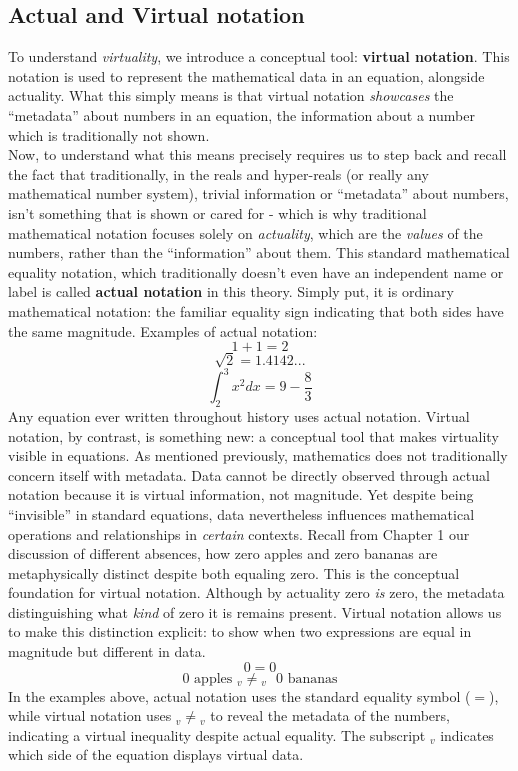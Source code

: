 \documentclass{article}
\begin{document}
\subsection{Actual and Virtual notation}
To understand \textit{virtuality}, we introduce a conceptual tool: \textbf{virtual notation}. This notation is used to represent the mathematical data in an equation, alongside actuality. What this simply means is that virtual notation \textit{showcases} the ``metadata'' about numbers in an equation, the information about a number which is traditionally not shown.\\Now, to understand what this means precisely requires us to step back and recall the fact that traditionally, in the reals and hyper-reals (or really any mathematical number system), trivial information or ``metadata'' about numbers, isn't something that is shown or cared for - which is why traditional mathematical notation focuses solely on \textit{actuality}, which are the \textit{values} of the numbers, rather than the ``information'' about them. This standard mathematical equality notation, which traditionally doesn't even have an independent name or label is called \textbf{actual notation} in this theory. Simply put, it is ordinary mathematical notation: the familiar equality sign indicating that both sides have the same magnitude. Examples of actual notation:
$$1+1=2$$ 
$$\sqrt{2}=1.4142...$$ 
$$\int_2^3x^2dx=9-\frac{8}{3}$$
Any equation ever written throughout history uses actual notation. Virtual notation, by contrast, is something new: a conceptual tool that makes virtuality visible in equations. As mentioned previously, mathematics does not traditionally concern itself with metadata. Data cannot be directly observed through actual notation because it is virtual information, not magnitude. Yet despite being ``invisible'' in standard equations, data nevertheless influences mathematical operations and relationships in \textit{certain} contexts. Recall from Chapter 1 our discussion of different absences, how zero apples and zero bananas are metaphysically distinct despite both equaling zero. This is the conceptual foundation for virtual notation. Although by actuality zero \textit{is} zero, the metadata distinguishing what \textit{kind} of zero it is remains present. Virtual notation allows us to make this distinction explicit: to show when two expressions are equal in magnitude but different in data. $$0=0$$ $$0 \text{ apples }{}_v{\neq}{}_v\text{ }0\text{ bananas}$$ In the examples above, actual notation uses the standard equality symbol ($=$), while virtual notation uses ${}_v{\neq}{}_v$ to reveal the metadata of the numbers, indicating a virtual inequality despite actual equality. The subscript $_v$ indicates which side of the equation displays virtual data.
\end{document}
